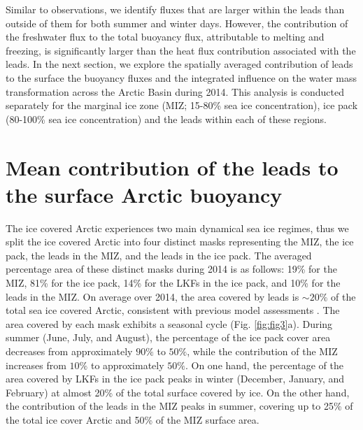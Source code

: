 \documentclass[lineno,sn-basic]{sn-jnl}%
\begin{document}
Similar to observations, we identify fluxes that are larger within the leads than outside of them for both summer and winter days. However, the contribution of the freshwater flux to the total buoyancy flux, attributable to melting and freezing, is significantly larger than the heat flux contribution associated with the leads. In the next section, we explore the spatially averaged contribution of leads to the surface the buoyancy fluxes and the integrated influence on the water mass transformation across the Arctic Basin during 2014. This analysis is conducted separately for the marginal ice zone (MIZ; 15-80\% sea ice concentration), ice pack (80-100\% sea ice concentration) and the leads within each of these regions. 


\section{Mean contribution of the leads to the surface Arctic buoyancy}\label{sec3}

The ice covered Arctic experiences two main dynamical sea ice regimes, thus we split the ice covered Arctic into four distinct masks representing the MIZ, the ice pack, the leads in the MIZ, and the leads in the ice pack. The averaged percentage area of these distinct masks during 2014 is as follows: 19\% for the MIZ, 81\% for the ice pack, 14\% for the LKFs in the ice pack, and 10\% for the leads in the MIZ. On average over 2014, the area covered by leads is $\sim 20\%$ of the total sea ice covered Arctic, consistent with previous model assessments \citep{Wang_leads_2016}. 
The area covered by each mask exhibits a seasonal cycle (Fig. \ref{fig:fig3}a). During summer (June, July, and August), the percentage of the ice pack cover area decreases from approximately $90\%$ to $50\%$, while the contribution of the MIZ increases from $10\%$ to approximately $50\%$. 
On one hand, the percentage of the area covered by LKFs in the ice pack peaks in winter (December, January, and February) at almost 20\% of the total surface covered by ice. On the other hand, the contribution of the leads in the MIZ peaks in summer, covering up to 25\% of the total ice cover Arctic and 50\% of the MIZ surface area. 
\end{document}
